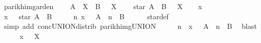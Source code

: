 \begin{isabellebody}
%
\endisatagproof
{\isafoldproof}%
%
\isadelimproof
\isanewline
%
\endisadelimproof
\isanewline
{}\isamarkupfalse%
\ parikh{\isacharunderscore}{\kern0pt}img{\isacharunderscore}{\kern0pt}arden{\isacharcolon}{\kern0pt}\isanewline
\ \ \ {\isachardoublequoteopen}{\isasymPsi}\ {\isacharparenleft}{\kern0pt}A\ {\isacharat}{\kern0pt}{\isacharat}{\kern0pt}\ X\ {\isasymunion}\ B{\isacharparenright}{\kern0pt}\ {\isasymsubseteq}\ {\isasymPsi}\ X{\isachardoublequoteclose}\isanewline
\ \ \ {\isachardoublequoteopen}{\isasymPsi}\ {\isacharparenleft}{\kern0pt}star\ A\ {\isacharat}{\kern0pt}{\isacharat}{\kern0pt}\ B{\isacharparenright}{\kern0pt}\ {\isasymsubseteq}\ {\isasymPsi}\ X{\isachardoublequoteclose}\isanewline
%
\isadelimproof
%
\endisadelimproof
%
\isatagproof
{}\isamarkupfalse%
\isanewline
\ \ \isamarkupfalse%
\ x\isanewline
\ \ \isamarkupfalse%
\ {\isachardoublequoteopen}x\ {\isasymin}\ {\isasymPsi}\ {\isacharparenleft}{\kern0pt}star\ A\ {\isacharat}{\kern0pt}{\isacharat}{\kern0pt}\ B{\isacharparenright}{\kern0pt}{\isachardoublequoteclose}\isanewline
\ \ \isamarkupfalse%
\ \isamarkupfalse%
\ {\isachardoublequoteopen}{\isasymexists}n{\isachardot}{\kern0pt}\ x\ {\isasymin}\ {\isasymPsi}\ {\isacharparenleft}{\kern0pt}A\ {\isacharcircum}{\kern0pt}{\isacharcircum}{\kern0pt}\ n\ {\isacharat}{\kern0pt}{\isacharat}{\kern0pt}\ B{\isacharparenright}{\kern0pt}{\isachardoublequoteclose}\isanewline
\ \ \ \ \isamarkupfalse%
\ star{\isacharunderscore}{\kern0pt}def\ \isamarkupfalse%
\ {\isacharparenleft}{\kern0pt}simp\ add{\isacharcolon}{\kern0pt}\ conc{\isacharunderscore}{\kern0pt}UNION{\isacharunderscore}{\kern0pt}distrib{\isacharparenleft}{\kern0pt}{}{\isacharparenright}{\kern0pt}\ parikh{\isacharunderscore}{\kern0pt}img{\isacharunderscore}{\kern0pt}UNION{\isacharparenright}{\kern0pt}\isanewline
\ \ \isamarkupfalse%
\ \isamarkupfalse%
\ n\ \ {\isachardoublequoteopen}x\ {\isasymin}\ {\isasymPsi}\ {\isacharparenleft}{\kern0pt}A\ {\isacharcircum}{\kern0pt}{\isacharcircum}{\kern0pt}\ n\ {\isacharat}{\kern0pt}{\isacharat}{\kern0pt}\ B{\isacharparenright}{\kern0pt}{\isachardoublequoteclose}\ \isamarkupfalse%
\ blast\isanewline
\ \ \isamarkupfalse%
\ \isamarkupfalse%
\ {\isachardoublequoteopen}x\ {\isasymin}\ {\isasymPsi}\ X{\isachardoublequoteclose}\ \isamarkupfalse%

\end{isabellebody}
